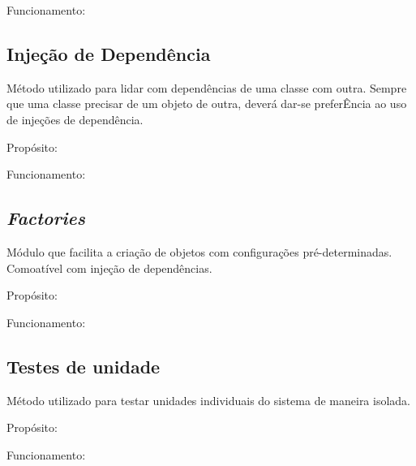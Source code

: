 \documentclass[11pt, a4paper]{article}
\begin{document}
            Funcionamento: %

        \subsection{Injeção de Dependência}
            Método utilizado para lidar com dependências de uma classe com
            outra. Sempre que uma classe precisar de um objeto de outra,
            deverá dar-se preferÊncia ao uso de injeções de dependência.

            Propósito: %

            Funcionamento: %

        \subsection{\textit{Factories}}
            Módulo que facilita a criação de objetos com configurações
            pré-determinadas. Comoatível com injeção de dependências.

            Propósito: %

            Funcionamento: %

        \subsection{Testes de unidade}
            Método utilizado para testar unidades individuais do sistema de
            maneira isolada.

            Propósito: %

            Funcionamento: %
        
\end{document}
